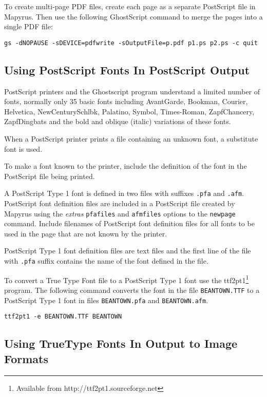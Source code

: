 To create multi-page PDF files, create each page as a separate
PostScript file in Mapyrus.  Then use the following GhostScript command to
merge the pages into a single PDF file:

\begin{verbatim}
gs -dNOPAUSE -sDEVICE=pdfwrite -sOutputFile=p.pdf p1.ps p2.ps -c quit
\end{verbatim}

\subsection{Using PostScript Fonts In PostScript Output}
\label{psfonts}

PostScript printers and the Ghostscript program
understand a limited number of fonts,
normally only 35 basic fonts including
AvantGarde,
Bookman,
Courier,
Helvetica,
NewCenturySchlbk,
Palatino,
Symbol,
Times-Roman,
ZapfChancery,
ZapfDingbats
and the bold
and oblique (italic) variations of these fonts.

When a PostScript printer prints a file containing an unknown font,
a substitute font is used.

To make a font known to the printer, include the definition of
the font in the PostScript file being printed.

A PostScript Type 1 font is defined in two files with suffixes
\texttt{.pfa} and \texttt{.afm}.  PostScript
font definition files are included in a PostScript file created
by Mapyrus using the
\textit{extras} \texttt{pfafiles} and \texttt{afmfiles}
options to the \texttt{newpage} command.
Include filenames of PostScript font definition files for all fonts to be used
in the page that are not known by the printer.

PostScript Type 1 font definition files are text files and
the first line of the file with \texttt{.pfa} suffix
contains the name of the font defined in the file.

To convert a True Type Font file to a PostScript Type 1 font use the
ttf2pt1\footnote{Available from http://ttf2pt1.sourceforge.net} program.  The
following command converts the font in the file \texttt{BEANTOWN.TTF} to a
PostScript Type 1 font in files
\texttt{BEANTOWN.pfa} and
\texttt{BEANTOWN.afm}.

\begin{verbatim}
ttf2pt1 -e BEANTOWN.TTF BEANTOWN
\end{verbatim}

\subsection{Using TrueType Fonts In Output to Image Formats}
\label{ttffonts}

